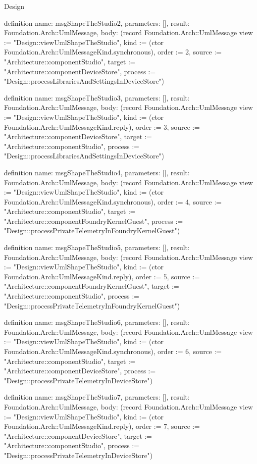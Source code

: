\begin{lexlean}{Design}
\begin{semanticmodule}
definition{
  name: msgShapeTheStudio2,
  parameters: [],
  result: Foundation.Arch::UmlMessage,
  body: (record Foundation.Arch::UmlMessage {view := "Design::viewUmlShapeTheStudio", kind := (ctor Foundation.Arch::UmlMessageKind.synchronous), order := 2, source := "Architecture::componentStudio", target := "Architecture::componentDeviceStore", process := "Design::processLibrariesAndSettingsInDeviceStore"})
}

definition{
  name: msgShapeTheStudio3,
  parameters: [],
  result: Foundation.Arch::UmlMessage,
  body: (record Foundation.Arch::UmlMessage {view := "Design::viewUmlShapeTheStudio", kind := (ctor Foundation.Arch::UmlMessageKind.reply), order := 3, source := "Architecture::componentDeviceStore", target := "Architecture::componentStudio", process := "Design::processLibrariesAndSettingsInDeviceStore"})
}

definition{
  name: msgShapeTheStudio4,
  parameters: [],
  result: Foundation.Arch::UmlMessage,
  body: (record Foundation.Arch::UmlMessage {view := "Design::viewUmlShapeTheStudio", kind := (ctor Foundation.Arch::UmlMessageKind.synchronous), order := 4, source := "Architecture::componentStudio", target := "Architecture::componentFoundryKernelGuest", process := "Design::processPrivateTelemetryInFoundryKernelGuest"})
}

definition{
  name: msgShapeTheStudio5,
  parameters: [],
  result: Foundation.Arch::UmlMessage,
  body: (record Foundation.Arch::UmlMessage {view := "Design::viewUmlShapeTheStudio", kind := (ctor Foundation.Arch::UmlMessageKind.reply), order := 5, source := "Architecture::componentFoundryKernelGuest", target := "Architecture::componentStudio", process := "Design::processPrivateTelemetryInFoundryKernelGuest"})
}

definition{
  name: msgShapeTheStudio6,
  parameters: [],
  result: Foundation.Arch::UmlMessage,
  body: (record Foundation.Arch::UmlMessage {view := "Design::viewUmlShapeTheStudio", kind := (ctor Foundation.Arch::UmlMessageKind.synchronous), order := 6, source := "Architecture::componentStudio", target := "Architecture::componentDeviceStore", process := "Design::processPrivateTelemetryInDeviceStore"})
}

definition{
  name: msgShapeTheStudio7,
  parameters: [],
  result: Foundation.Arch::UmlMessage,
  body: (record Foundation.Arch::UmlMessage {view := "Design::viewUmlShapeTheStudio", kind := (ctor Foundation.Arch::UmlMessageKind.reply), order := 7, source := "Architecture::componentDeviceStore", target := "Architecture::componentStudio", process := "Design::processPrivateTelemetryInDeviceStore"})
}


\end{semanticmodule}
\end{lexlean}
